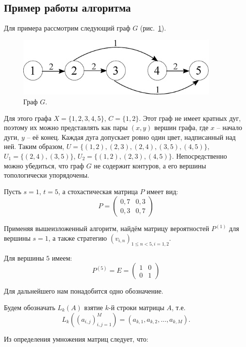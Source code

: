 \subsection{Пример работы алгоритма}
\par Для примера рассмотрим следующий граф $G$ (рис.~\ref{fig:picg}).

\begin{figure}[h]
	\begin{center}
	\includegraphics[width=0.9\textwidth]{example1}
	\end{center}
	\caption{Граф $G$.}
	\label{fig:picg}
\end{figure}
\par Для этого графа $X = \{1, 2, 3, 4, 5\}$, $C = \{1, 2\}$. Этот граф не имеет кратных дуг, поэтому их можно представлять как пары $(x, y)$ вершин графа, где $x$ -- начало дуги, $y$ -- её конец. Каждая дуга допускает ровно один цвет, надписанный над ней. Таким образом, $U =\{(1, 2), (2, 3), (2, 4), (3, 5), (4, 5)\}$, $U_1 =\{(2, 4), (3, 5)\}$, $U_2 =\{(1, 2), (2, 3), (4, 5)\}$. Непосредственно можно убедиться, что граф $G$ не содержит контуров, а его вершины топологически упорядочены.
\par Пусть $s = 1$, $t = 5$, а стохастическая матрица $P$ имеет вид:
\[P = \begin{pmatrix} 
0,7 & 0,3\\ 
0,3 & 0,7 
\end{pmatrix}
\]
\par Применяя вышеизложенный алгоритм, найдём матрицу вероятностей $P^{(1)}$ для вершины $s = 1$, а также стратегию $(v_{i, n})_{1 \le n < 5, i = 1, 2}$.
\par Для вершины $5$ имеем:
\[P^{(5)} = E = \begin{pmatrix} 
1 & 0\\ 
0 & 1 
\end{pmatrix}
\]
\par Для дальнейшего нам понадобится одно обозначение.
\par Будем обозначать $L_k(A)$ взятие $k$-й строки матрицы $A$, т.е. 
\[L_k((a_{i,j})_{i,j = 1}^{M}) = (a_{k, 1}, a_{k, 2}, ..., a_{k, M}).\]
\par Из определения умножения матриц следует, что:
